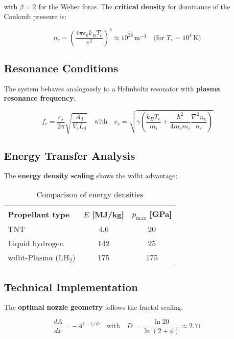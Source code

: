 with $\beta = 2$ for the Weber force. The \textbf{critical density} for dominance of the Coulomb pressure is:

\begin{equation}
n_c = \left(\frac{4\pi \epsilon_0 k_B T_e}{e^2}\right)^3 \approx 10^{28}\,\text{m}^{-3}\quad\text{(for }T_e=10^4\,\text{K)}
\end{equation}

\subsection{Resonance Conditions}
\label{subsec:resonanz}

The system behaves analogously to a Helmholtz resonator with \textbf{plasma resonance frequency}:

\begin{equation}
f_r = \frac{c_s}{2\pi}\sqrt{\frac{A_d}{V_c L_d}} \quad \text{with} \quad c_s = \sqrt{\gamma \left(\frac{k_B T_e}{m_i} + \frac{\hbar^2}{4m_e m_i}\frac{\nabla^2 n_e}{n_e}\right)}
\label{eq:resonanz}
\end{equation}

\subsection{Energy Transfer Analysis}
\label{subsec:energie}

The \textbf{energy density scaling} shows the \gls{wdbt} advantage:

\begin{table}[h]
\centering
\caption{Comparison of energy densities}
\label{tab:energie}
\begin{tabular}{lcc}
\toprule
Propellant type & $E$ [MJ/kg] & $p_{\text{max}}$ [GPa] \\
\midrule
TNT & 4.6 & 20 \\
Liquid hydrogen & 142 & 25 \\
\gls{wdbt}-Plasma (LH$_2$) & 175 & 175 \\
\bottomrule
\end{tabular}
\end{table}

\subsection{Technical Implementation}
\label{subsec:tech}

The \textbf{optimal nozzle geometry} follows the fractal scaling:

\begin{equation}
\frac{dA}{dx} = -A^{1-1/D} \quad \text{with} \quad D = \frac{\ln 20}{\ln(2+\phi)} \approx 2.71
\label{eq:duese}
\end{equation}

